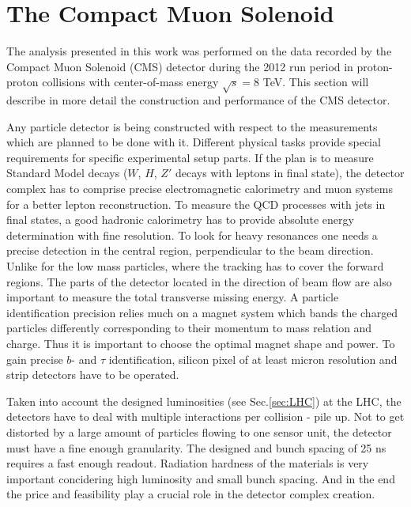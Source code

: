 
\section{The Compact Muon Solenoid}\label{sec:CMS}

The analysis presented in this work was performed on the data recorded by the Compact Muon Solenoid (CMS) detector\cite{CMSatLHC} during the 2012
run period in proton-proton collisions with center-of-mass energy $\sqrt{s} = $8 TeV. This section will describe in more detail 
the construction and performance of the CMS detector.

Any particle detector is being constructed with respect to the measurements which are planned to be done with it. Different physical
tasks provide special requirements for specific experimental setup parts. If the plan is to measure Standard Model decays
($W$, $H$, $Z'$ decays with leptons in final state), the detector complex has to comprise precise electromagnetic calorimetry and 
muon systems for a better lepton reconstruction. To measure the QCD processes with jets in final states, a
good hadronic calorimetry has to provide absolute energy determination with fine resolution. To look for heavy resonances one needs a
precise detection in the central region, perpendicular to the beam direction. Unlike for the low mass particles, where the tracking
has to cover the forward regions. The parts of the detector located in the direction of beam flow are also important to measure the 
total transverse missing energy. A particle identification precision relies much on a magnet system which bands the charged 
particles differently corresponding to their momentum to mass relation and charge. Thus it is important to choose the optimal magnet
shape and power. To gain precise $b$- and $\tau$ identification, silicon
pixel of at least micron resolution and strip detectors have to be operated. 

Taken into account the designed luminosities (see Sec.\ref{sec:LHC}) at the LHC,
the detectors have to deal with multiple interactions per collision - pile up. Not to get distorted by a large amount of particles 
flowing to one sensor unit, the detector must have a fine enough granularity. The designed and bunch spacing of 25 ns 
requires a fast enough readout. Radiation hardness of the materials is very important concidering high luminosity and small
bunch spacing. And in the end the price and feasibility play a crucial role in the detector complex creation.

